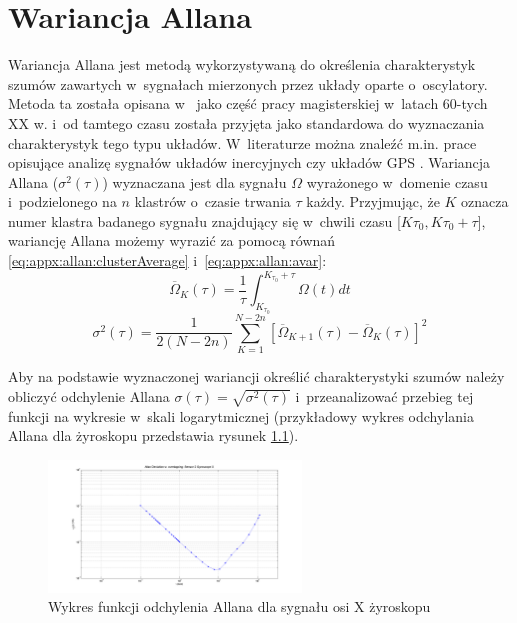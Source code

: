 \chapter{Wariancja Allana}\label{chap:appx:allan}
Wariancja Allana jest metodą wykorzystywaną do określenia charakterystyk szumów zawartych w~sygnałach mierzonych przez układy oparte o~oscylatory. Metoda ta została opisana w~\cite{Allan1966} jako część pracy magisterskiej w~latach 60-tych XX w. i~od tamtego czasu została przyjęta jako standardowa do wyznaczania charakterystyk tego typu układów. W~literaturze można znaleźć m.in. prace opisujące analizę sygnałów układów inercyjnych \cite{El-Sheimy2008, FreescaleSemiconductor2015} czy układów GPS \cite{Wright2007}. 
Wariancja Allana ($\sigma^2(\tau)$) wyznaczana jest dla sygnału $\Omega$ wyrażonego w~domenie czasu i~podzielonego na $n$ klastrów o~czasie trwania $\tau$ każdy. Przyjmując, że $K$ oznacza numer klastra badanego sygnału znajdujący się w~chwili czasu [$K\tau_0 , K\tau_0+\tau$], wariancję Allana możemy wyrazić za pomocą równań \eqref{eq:appx:allan:clusterAverage} i~\eqref{eq:appx:allan:avar}:
\begin{equation}
\label{eq:appx:allan:clusterAverage}
\overline{\Omega}_K(\tau) = \frac{1}{\tau}\int_{K_{\tau_0}}^{K_{\tau_0}+\tau}\Omega(t)dt
\end{equation}
\begin{equation}
\label{eq:appx:allan:avar}
\sigma^2(\tau) = \frac{1}{2(N-2n)}\sum_{K=1}^{N-2n}[\overline{\Omega}_{K+1}(\tau)-\overline{\Omega}_K(\tau)]^2
\end{equation}

Aby na podstawie wyznaczonej wariancji określić charakterystyki szumów należy obliczyć odchylenie Allana $\sigma(\tau) = \sqrt{\sigma^2(\tau)}$ i~przeanalizować przebieg tej funkcji na wykresie w~skali logarytmicznej (przykładowy wykres odchylania Allana dla żyroskopu przedstawia rysunek \ref{fig:appx:allan:deviationPlot}). 

\begin{figure}
	\centering
	\includegraphics[width=0.6\textwidth]{images/Allans2GyroXosig.png}
	\caption{Wykres funkcji odchylenia Allana dla sygnału osi X żyroskopu}
	\label{fig:appx:allan:deviationPlot}
\end{figure}

